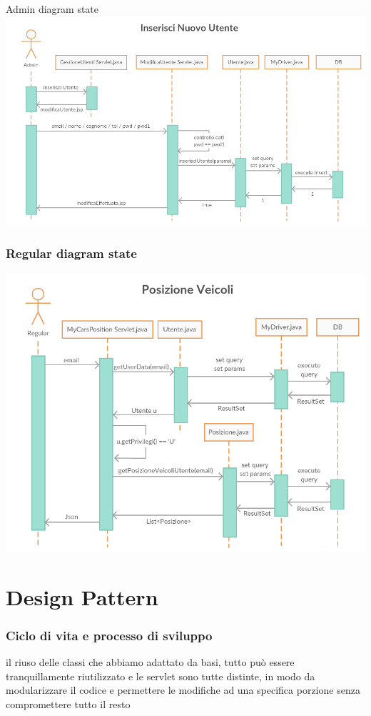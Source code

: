 \documentclass[a4paper,12pt]{beamer}
\begin{document}
\begin{frame}{Admin diagram state}
\includegraphics[scale=0.32]{AdminSeq.png}
\end{frame}

\begin{frame}
\frametitle{Regular diagram state}
\includegraphics[scale=0.38]{RegularSeq.png}
\end{frame}

\pagebreak

\section{Design Pattern}
\begin{frame}
\frametitle{Ciclo di vita e processo di sviluppo}
il riuso delle classi che abbiamo adattato da basi, tutto può essere tranquillamente riutilizzato e le servlet sono tutte distinte, in modo da modularizzare il codice e permettere le modifiche ad una specifica porzione senza compromettere tutto il resto
\end{frame}
\end{document}
